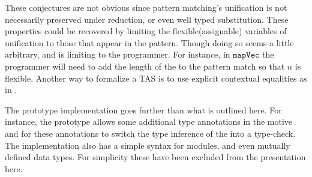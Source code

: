 These conjectures are not obvious since pattern matching's unification is not necessarily preserved under reduction, or even well typed substitution.
These properties could be recovered by limiting the flexible(assignable) variables of unification to those that appear in the pattern.
Though doing so seems a little arbitrary, and is limiting to the programmer.
For instance, in $\mathtt{mapVec}$ the programmer will need to add the length of the \Vect{} to the pattern match so that $n$ is flexible.
Another way to formalize a \ac{TAS} is to use explicit contextual equalities as in \cite{sjoberg2015dependently}.
 
The prototype implementation goes further than what is outlined here.
For instance, the prototype allows some additional type annotations in the motive and for these annotations to switch the type inference of the \scrut{} into a type-check.
The implementation also has a simple syntax for modules, and even mutually defined data types.
For simplicity these have been excluded from the presentation here.